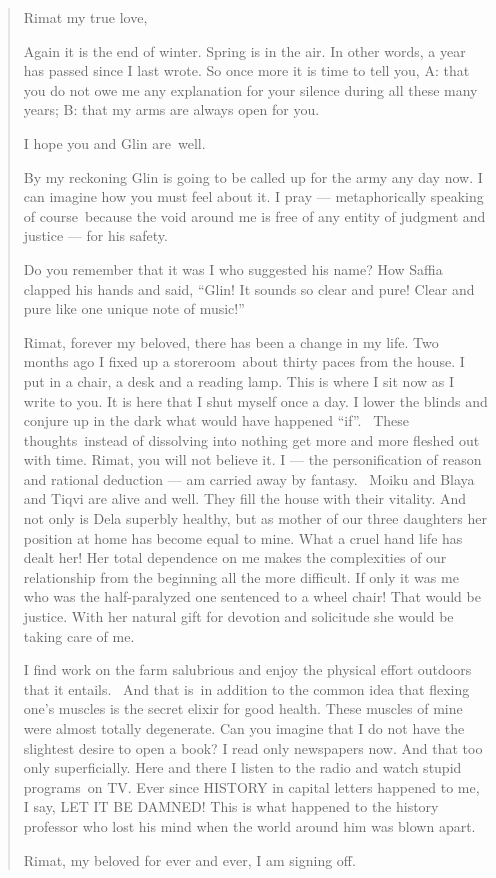 \documentclass[twoside,11pt]{book}
\begin{document}
\begin{quotation}
Rimat my true love,

Again it is the end of winter. Spring is in the air. In other words,  a year has passed since I last wrote. So once
more it is time to tell you, A: that you do not owe me any explanation for your silence during all these many years;
B: that my arms are always open for you.

I hope you and Glin are~well.

By my reckoning Glin is going to be called up for the army any day now. I can imagine how you must feel about it. I pray
--- metaphorically speaking of course~because the void around me is free of any entity of judgment and justice --- for his
safety.

Do you remember that it was I who suggested his name? How Saffia clapped his hands and said, ``Glin! It
sounds so clear and pure! Clear and pure like one unique {note of music}!''

Rimat, forever my beloved, there has been a change in my life. Two months ago I fixed up a storeroom~about thirty paces
from the house. I put in a chair, a desk and a reading lamp. This is where I sit now as I write to you. It is here that I
shut myself once a day. I lower the blinds and conjure up in the dark what would have happened
``if''.~ These thoughts~instead of dissolving into nothing get more and more fleshed out with
time. Rimat, you will not believe it. I --- the personification of reason and rational deduction --- am carried away by
fantasy.~ Moiku and Blaya and Tiqvi are alive and well. They fill the house with their vitality. And not only is Dela
superbly healthy, but as mother of our three daughters her position at home has become equal to mine. What a cruel hand
life has dealt her! Her total dependence on me makes the complexities of our relationship from the beginning all the
more difficult.  If only it was me who was the half-paralyzed one sentenced to a wheel chair! That would be justice.
With her natural gift for devotion and solicitude she would be taking care of me.

I find work on the farm salubrious and enjoy the physical effort outdoors that it entails.~ And that is~in addition to
the common idea that flexing one's muscles is the secret elixir for good health. These muscles of mine were almost
totally degenerate. Can you imagine that I do not have the slightest desire to open a book? I read only newspapers now.
And that too only superficially. Here and there I listen to the radio and watch stupid programs~on TV. Ever since
HISTORY in capital letters happened to me, I say, LET IT BE DAMNED! This is what happened to the history professor who
lost his mind when the world around him was blown apart.

Rimat, my beloved for ever and ever, I am signing off.
\end{quotation}
\end{document}
